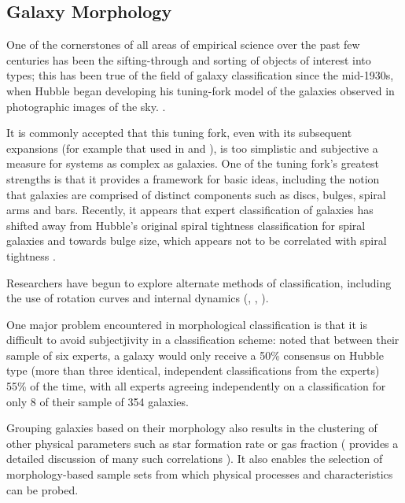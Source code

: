 \documentclass[../main.tex]{subfiles}
\begin{document}
\label{sec:introduction}
\subsection{Galaxy Morphology}
\label{subsec:galaxy-morphology}
One of the cornerstones of all areas of empirical science over the past few centuries has been the sifting-through and sorting of objects of interest into types; this has been true of the field of galaxy classification since the mid-1930s, when Hubble began developing his tuning-fork model of the galaxies observed in photographic images of the sky. \citep{Hubble1936}.

It is commonly accepted that this tuning fork, even with its subsequent expansions (for example that used in \citealt{Sandage1961} and \citealt{deVaucouleurs1991}), is too simplistic and subjective a measure for systems as complex as galaxies. One of the tuning fork's greatest strengths is that it provides a framework for basic ideas, including the notion that galaxies are comprised of distinct components such as discs, bulges, spiral arms and bars. Recently, it appears that expert classification of galaxies has shifted away from Hubble's original spiral tightness classification for spiral galaxies and towards bulge size, which appears not to be correlated with spiral tightness \citep{Masters2019:1904.11436v1}.

Researchers have begun to explore alternate methods of classification, including the use of rotation curves and internal dynamics (\citealt{2011MNRAS.413..813C}, \citealt{2017MNRAS.469.2539K}, \citealt{Fall2018:1812.06144v1}).

One major problem encountered in morphological classification is that it is difficult to avoid subjectjivity in a classification scheme: \citet{Naim1995:astro-ph/9502078v1} noted that between their sample of six experts, a galaxy would only receive a 50\% consensus on Hubble type (more than three identical, independent classifications from the experts) 55\% of the time, with all experts agreeing independently on a classification for only 8 of their sample of 354 galaxies.

Grouping galaxies based on their morphology also results in the clustering of other physical parameters such as star formation rate or gas fraction (\citealt{RobertsHaynes1994} provides a detailed discussion of many such correlations ). It also enables the selection of morphology-based sample sets from which physical processes and characteristics can be probed.
\end{document}

